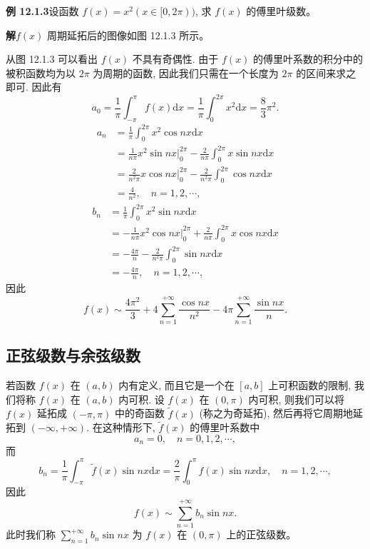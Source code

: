 \documentclass[UTF8, 12pt, fontset=fandol, oneside]{ctexart}
\begin{document}
\noindent\textbf{例 12.1.3}\quad 设函数 $f(x)=x^2(x\in[0,2\pi))$, 求 $f(x)$ 的傅里叶级数。

\noindent\textbf{解}\quad $f(x)$ 周期延拓后的图像如图 12.1.3 所示。

从图 12.1.3 可以看出 $f(x)$ 不具有奇偶性. 由于 $f(x)$ 的傅里叶系数的积分中的被积函数均为以 $2\pi$ 为周期的函数, 因此我们只需在一个长度为 $2\pi$ 的区间来求之即可. 因此有
\[
  a_0=\frac1\pi\int_{-\pi}^{\pi}f(x)\mathrm dx
  =\frac1\pi\int_0^{2\pi}x^2\mathrm dx
  =\frac83\pi^2.
\]
\[
\begin{aligned}
  a_n
  &=\frac1\pi\int_0^{2\pi}x^2\cos nx\mathrm dx\\
  &=\frac1{n\pi}x^2\sin nx\bigg|_0^{2\pi}
    -\frac2{n\pi}\int_0^{2\pi}x\sin nx\mathrm dx\\
  &=\frac2{n^2\pi}x\cos nx\bigg|_0^{2\pi}
    -\frac2{n^2\pi}\int_0^{2\pi}\cos nx\mathrm dx\\
  &=\frac4{n^2},\quad n=1,2,\cdots,
\end{aligned}
\]
\[
\begin{aligned}
  b_n
  &=\frac1\pi\int_0^{2\pi}x^2\sin nx\mathrm dx\\
  &=-\frac1{n\pi}x^2\cos nx\bigg|_0^{2\pi}
    +\frac2{n\pi}\int_0^{2\pi}x\cos nx\mathrm dx\\
  &=-\frac{4\pi}{n}-\frac2{n^2\pi}\int_0^{2\pi}\sin nx\mathrm dx\\
  &=-\frac{4\pi}{n},\quad n=1,2,\cdots,
\end{aligned}
\]
因此
\[
  f(x)\sim\frac{4\pi^2}{3}
  +4\sum_{n=1}^{+\infty}\frac{\cos nx}{n^2}
  -4\pi\sum_{n=1}^{+\infty}\frac{\sin nx}{n}.
\]

\subsection{正弦级数与余弦级数}

若函数 $f(x)$ 在 $(a,b)$ 内有定义, 而且它是一个在 $[a,b]$ 上可积函数的限制, 我们将称 $f(x)$ 在 $(a,b)$ 内可积. 设 $f(x)$ 在 $(0,\pi)$ 内可积, 则我们可以将 $f(x)$ 延拓成 $(-\pi,\pi)$ 中的奇函数 $\widetilde f(x)$ (称之为奇延拓), 然后再将它周期地延拓到 $(-\infty,+\infty)$. 在这种情形下, $\widetilde f(x)$ 的傅里叶系数中
\[
  a_n=0,\quad n=0,1,2,\cdots,
\]
而
\[
  b_n=\frac1\pi\int_{-\pi}^{\pi}\widetilde f(x)\sin nx\mathrm dx
  =\frac2\pi\int_0^\pi f(x)\sin nx\mathrm dx,\quad n=1,2,\cdots,
\]
因此
\[
  f(x)\sim\sum_{n=1}^{+\infty}b_n\sin nx.
\]
此时我们称 $\sum\limits_{n=1}^{+\infty}b_n\sin nx$ 为 $f(x)$ 在 $(0,\pi)$ 上的正弦级数。
\end{document}
